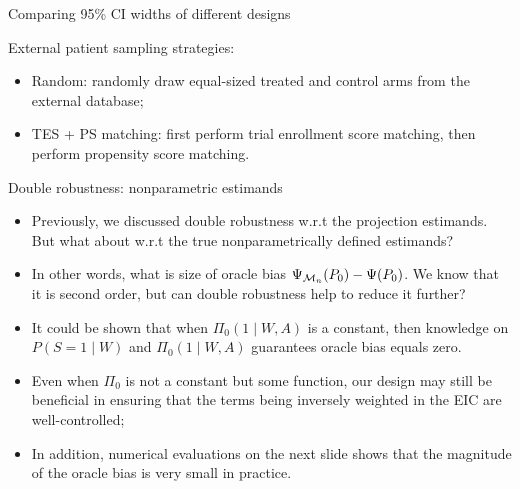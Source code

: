 \documentclass[t]{beamer}
\begin{document}
\begin{frame}{Comparing 95\% CI widths of different designs}
\begin{table}[h]
\centering
\caption{Average 95\% confidence interval widths by external data sample size and sampling strategy.}
\end{table}
External patient sampling strategies:
\begin{itemize}
\item Random: randomly draw equal-sized treated and control arms from the external database;
\item TES + PS matching: first perform trial enrollment score matching, then perform propensity score matching.
\end{itemize}
\end{frame}

\begin{frame}{Double robustness: nonparametric estimands}
\begin{itemize}
\item Previously, we discussed double robustness w.r.t the projection estimands. But what about w.r.t the true nonparametrically defined estimands?
\item In other words, what  is size of oracle bias $\Psi_{{\cal M}_n}(P_0)-\Psi(P_0)$. We know that it is second order, but can double robustness help to reduce it further? 
\item It could be shown that when $\Pi_0(1\mid W,A)$ is a constant, then knowledge on $P(S=1\mid W)$ and $\Pi_0(1\mid W,A)$  guarantees oracle bias equals zero. 
\item Even when $\Pi_0$ is not a constant but some function, our design may still be beneficial in ensuring that the terms being inversely weighted in the EIC are well-controlled;
\item In addition, numerical evaluations on the next slide shows that the magnitude of the oracle bias is very small in practice. 
\end{itemize}
\end{frame}
\end{document}
